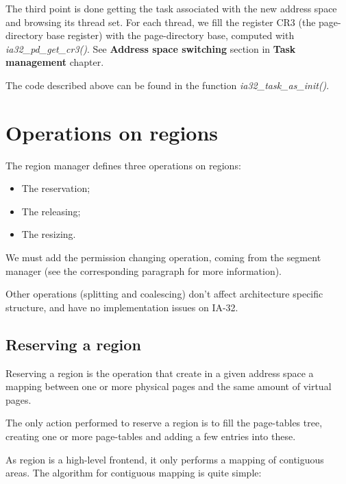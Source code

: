 The third point is done getting the task associated with the new
address space and browsing its thread set. For each thread, we fill
the register CR3 (the page-directory base register) with the
page-directory base, computed with \textit{ia32\_pd\_get\_cr3()}. See
\textbf{Address space switching} section in \textbf{Task management}
chapter.

The code described above can be found in the function
\textit{ia32\_task\_as\_init()}.

%
%

\section{Operations on regions}

The region manager defines three operations on regions:

\begin{itemize}
\item
  The reservation;
\item
  The releasing;
\item
  The resizing.
\end{itemize}

We must add the permission changing operation, coming from the segment
manager (see the corresponding paragraph for more information).

Other operations (splitting and coalescing) don't affect architecture
specific structure, and have no implementation issues on IA-32.

%
%

\subsection{Reserving a region}

Reserving a region is the operation that create in a given address
space a mapping between one or more physical pages and the same amount
of virtual pages.

The only action performed to reserve a region is to fill the
page-tables tree, creating one or more page-tables and adding a few
entries into these.

As region is a high-level frontend, it only performs a mapping of
contiguous areas. The algorithm for contiguous mapping is quite simple:


